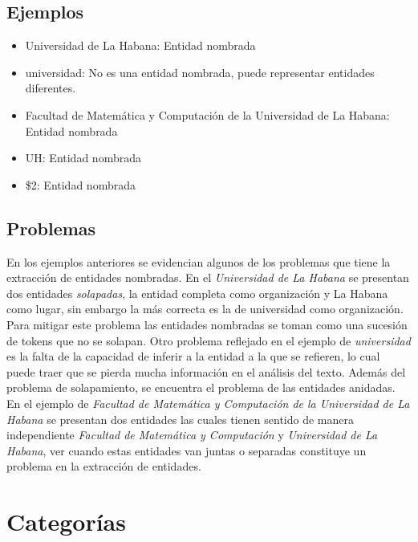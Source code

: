 \documentclass[runningheads]{llncs}
\begin{document}
\subsection{Ejemplos}

\begin{itemize}

\item Universidad de La Habana: Entidad nombrada
\item universidad: No es una entidad nombrada, puede representar entidades diferentes.
\item Facultad de Matemática y Computación de la Universidad de La Habana: Entidad nombrada
\item UH: Entidad nombrada
\item \$2: Entidad nombrada
\end{itemize}

\subsection{Problemas}

En los ejemplos anteriores se evidencian algunos de los problemas que tiene la extracción de entidades nombradas. En el \emph{Universidad de La Habana} se presentan dos entidades \emph{solapadas}, la entidad completa como organización y La Habana como lugar, sin embargo la más correcta es la de universidad como organización. Para mitigar este problema las entidades nombradas se toman como una sucesión de tokens que no se solapan. Otro problema reflejado en el ejemplo de \emph{universidad} es la falta de la capacidad de inferir a la entidad a la que se refieren, lo cual puede traer que se pierda mucha información en el análisis del texto. Además del problema de solapamiento, se encuentra el problema de las entidades anidadas. En el ejemplo de \emph{Facultad de Matemática y Computación de la Universidad de La Habana} se presentan dos entidades las cuales tienen sentido de manera independiente \emph{Facultad de Matemática y Computación} y \emph{Universidad de La Habana}, ver cuando estas entidades van juntas o separadas constituye un problema en la extracción de entidades.

\section{Categorías}
\end{document}
